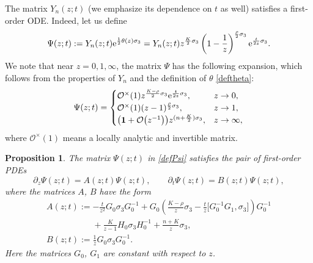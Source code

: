 \documentclass[10pt,a4paper]{amsart}
\numberwithin{equation}{section}
\newtheorem{Proposition}[Theorem]{Proposition}
\theoremstyle{definition}
\def\le{\left}
\def\ri{\right}
\def\be{\begin{equation}}
\def\ee{\end{equation}}
\def \1{\mathbf 1}
\def\s{\sigma}
\def\pa{\partial}
\begin{document}
The matrix $Y_n(z;t)$ (we emphasize its dependence on $t$ as well) satisfies a first-order ODE. Indeed, let us define
\be
\Psi(z;t):= Y_n(z;t) {\rm e}^{\frac 1 2 \theta(z) \s_3} =
 Y_n(z;t) z^{\frac{{ {K}}}2\s_3}
 \le(1- \frac 1 z\ri)^{\frac{{ {\rho}}}2\s_3} {\rm e}^{\frac t{2z} \s_3}.
\label{defPsi}
\ee
We note that near $z=0,1,\infty$, the matrix $\Psi$ has the following expansion, which follows from the properties of $Y_n$ and the definition of $\theta$ \eqref{deftheta}:
\be
\Psi(z;t) =
\begin{cases}
{\mathcal O}^\times(1) z^{\frac {{ {K}}-{ {\rho}}}2\s_3} {\rm e}^{\frac t {2z}\s_3},& z\to 0,\\
{\mathcal O}^\times(1) (z-1)^{\frac {{ {\rho}}}2\s_3}, & z\to 1,\\
\bigl(\1 + \mathcal O\bigl(z^{-1}\bigr) \bigr) z^{ (n+ \frac { {K}} 2)\s_3}, & z\to \infty,
\end{cases}
\label{Psiasy}
\ee
where $\mathcal O^\times(1)$ means a locally analytic and invertible matrix.
\begin{Proposition}
The matrix $\Psi(z;t)$ in \eqref{defPsi} satisfies the pair of first-order PDEs
\be
\label{Laxour}
\pa_z \Psi(z;t) = A(z;t) \Psi(z;t),\qquad
\pa_t \Psi(z;t) = B(z;t) \Psi(z;t),
\ee
where the matrices $A$, $B$ have the form
\begin{gather*}
A(z;t):= -\frac t {z^2} G_0 \s_3 G_0^{-1} + G_0\le(\frac{{ {K}}-{ {\rho}}}z\s_3 - \frac t z \big[G_0^{-1}G_1, \s_3\big]\ri) G_0^{-1} \\
\phantom{A(z;t):=}{}+\frac {{ {K}}}{z-1} H_0 \s_3 H_0^{-1} + \frac{n+{ {K}}}z \s_3,
\\
B(z;t):= \frac 1 {z} G_0 \s_3 G_0^{-1}.
\end{gather*}
Here the matrices $G_0$, $G_1$ are constant with respect to $z$.
\end{Proposition}
\end{document}
